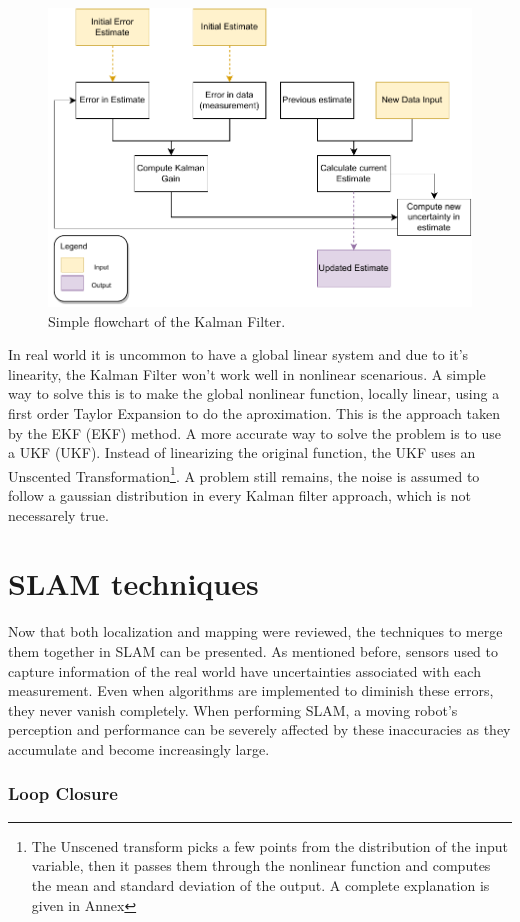 \begin{figure}[H]
    \centering
    \includegraphics[width=0.5\linewidth]{images/background/Kalman-diagram.pdf}
    \caption{Simple flowchart of the Kalman Filter.}
    \label{fig: flowchart kalman}
\end{figure}

In real world it is uncommon to have a global linear system and due to it's linearity, the Kalman Filter won't work well in nonlinear scenarious. A simple way to solve this is to make the global nonlinear function, locally linear, using a first order Taylor Expansion to do the aproximation. This is the approach taken by the \acl{EKF} (\acs*{EKF}) method. A more accurate way to solve the problem is to use a \acl*{UKF} (\acs*{UKF}). Instead of linearizing the original function, the \acs*{UKF} uses an Unscented Transformation\footnote{The Unscened transform picks a few points from the distribution of the input variable, then it passes them through the nonlinear function and computes the mean and standard deviation of the output. A complete explanation is given in Annex}. A problem still remains, the noise is assumed to follow a gaussian distribution in every Kalman filter approach, which is not necessarely true.

\section{\acs*{SLAM} techniques}

Now that both localization and mapping were reviewed, the techniques to merge them together in \acs*{SLAM} can be presented. As mentioned before, sensors used to capture information of the real world have uncertainties associated with each measurement. Even when algorithms are implemented to diminish these errors, they never vanish completely. When performing \acs*{SLAM}, a moving robot's perception and performance can be severely affected by these inaccuracies as they accumulate and become increasingly large. 

\subsubsection{Loop Closure}

